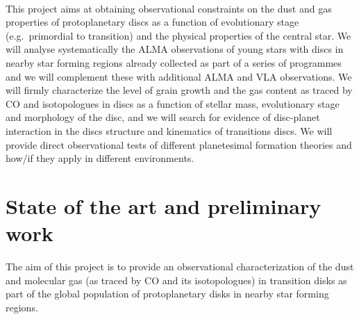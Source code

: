 \documentclass[10pt,fleqn,twoside]{article}
\begin{document}
\vspace{1em}
\\
This project aims at obtaining observational constraints on the dust and gas 
properties of protoplanetary discs as a function of evolutionary stage (e.g.\ primordial to transition) and 
the physical properties of the central star. We will analyse systematically
the ALMA observations of young stars with discs in nearby star forming regions already collected as part of a series of programmes and we will complement these with additional 
ALMA and VLA observations. We will firmly characterize the level of grain growth and the gas content as traced by CO and isotopologues in discs as a function of stellar mass, evolutionary stage and morphology of the disc, and we will search for evidence of disc-planet interaction in the discs structure and kinematics of transitions discs. We will provide direct observational tests of different planetesimal formation theories and how/if they apply in different environments.

\section{State of the art and preliminary work}
\renewcommand{\leftmark}{\sc State of the Art and preliminary work}
\label{s_state_art}

The aim of this project is to provide an observational characterization of the dust and molecular gas
(as traced by CO and its isotopologues) in transition disks as part of the global population of protoplanetary disks in nearby star forming regions.  
\end{document}
